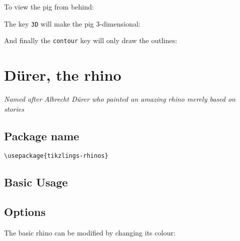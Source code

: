 \documentclass[parskip=half]{scrartcl}
\begin{document}
To view the pig from behind:
\begin{tcblisting}{}
\pig[back]
\end{tcblisting}

The key \lstinline|3D| will make the pig 3-dimensional:
\begin{tcblisting}{}
\pig[3D]
\end{tcblisting}

And finally the \lstinline|contour| key will only draw the outlines:
\begin{tcblisting}{}
\pig[contour=black]
\end{tcblisting}

%
%
\clearpage
\section[Rhino]{D\"urer, the rhino}

\emph{Named after Albrecht D\"urer who painted an amazing rhino merely based on stories}

\subsection{Package name}

\begin{tcolorbox}[lower separated=false, lefthand width=.8\linewidth]
\vspace*{0.5cm}
\lstinline|\usepackage{tikzlings-rhinos}| 
\vspace*{0.5cm}
\end{tcolorbox}

\subsection{Basic Usage}

\begin{tcblisting}{}
\rhino
\end{tcblisting}

\subsection{Options}

The basic rhino can be modified by changing its colour:
\begin{tcblisting}{}
\rhino[body=blue]
\end{tcblisting}
\end{document}

